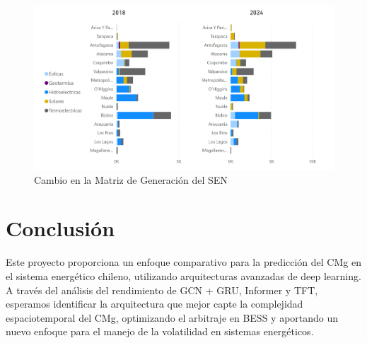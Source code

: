 \documentclass[twocolumn]{article}
\begin{document}
\begin{figure}[htbp]
    \centering
    \includegraphics[width=1\columnwidth]{matriz_sist.png}
    \caption{Cambio en la Matriz de Generación del SEN}
    \label{fig:matriz_sistema}
\end{figure}

\section{Conclusión}
Este proyecto proporciona un enfoque comparativo para la predicción del CMg en el sistema energético chileno, utilizando arquitecturas avanzadas de deep learning. A través del análisis del rendimiento de GCN + GRU, Informer y TFT, esperamos identificar la arquitectura que mejor capte la complejidad espaciotemporal del CMg, optimizando el arbitraje en BESS y aportando un nuevo enfoque para el manejo de la volatilidad en sistemas energéticos.
\end{document}
